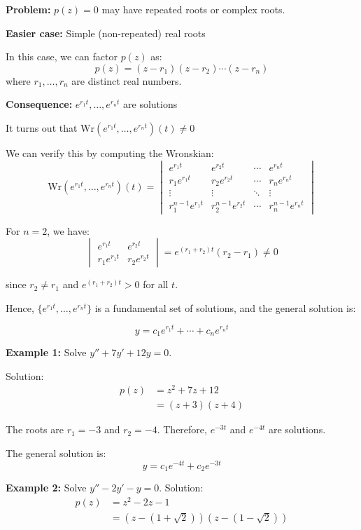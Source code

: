\documentclass{article}
\begin{document}
\textbf{Problem:} $p(z) = 0$ may have repeated roots or complex roots.

\textbf{Easier case:} Simple (non-repeated) real roots

In this case, we can factor $p(z)$ as:
\[
p(z) = (z-r_1)(z-r_2) \cdots (z-r_n)
\]
where $r_1, \ldots, r_n$ are distinct real numbers.

\textbf{Consequence:} $e^{r_1t}, \ldots, e^{r_nt}$ are solutions

It turns out that $\text{Wr}(e^{r_1t}, \ldots, e^{r_nt})(t) \neq 0$

We can verify this by computing the Wronskian:
\[
\text{Wr}(e^{r_1t}, \ldots, e^{r_nt})(t) = 
\begin{vmatrix}
e^{r_1t} & e^{r_2t} & \cdots & e^{r_nt} \\
r_1e^{r_1t} & r_2e^{r_2t} & \cdots & r_ne^{r_nt} \\
\vdots & \vdots & \ddots & \vdots \\
r_1^{n-1}e^{r_1t} & r_2^{n-1}e^{r_2t} & \cdots & r_n^{n-1}e^{r_nt}
\end{vmatrix}
\]

For $n = 2$, we have:
\[
\begin{vmatrix}
e^{r_1t} & e^{r_2t} \\
r_1e^{r_1t} & r_2e^{r_2t}
\end{vmatrix} = e^{(r_1+r_2)t}(r_2 - r_1) \neq 0
\]

since $r_2 \neq r_1$ and $e^{(r_1+r_2)t} > 0$ for all $t$.

Hence, $\{e^{r_1t}, \ldots, e^{r_nt}\}$ is a fundamental set of solutions, and the general solution is:

\[
y = c_1e^{r_1t} + \cdots + c_ne^{r_nt}
\]

\textbf{Example 1:} Solve $y''+7y'+12y = 0$.

Solution:
\begin{align*}
p(z) &= z^2+7z+12 \\
     &= (z+3)(z+4)
\end{align*}

The roots are $r_1 = -3$ and $r_2 = -4$. Therefore, $e^{-3t}$ and $e^{-4t}$ are solutions.

The general solution is:
\[
y = c_1e^{-4t} + c_2e^{-3t}
\]

\textbf{Example 2:} Solve $y''-2y'-y = 0$.
Solution:
\begin{align*}
p(z) &= z^2-2z-1 \\
     &= (z-(1+\sqrt{2}))(z-(1-\sqrt{2}))
\end{align*}
\end{document}
